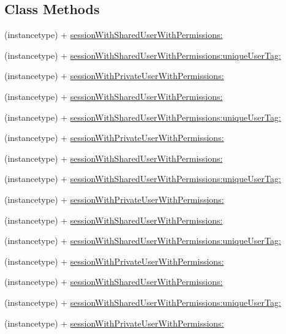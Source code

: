 \subsection*{Class Methods}
\begin{DoxyCompactItemize}
\item 
(instancetype) + \hyperlink{interfaceFBTestSession_a27f8f36ddb23ea218117bc2e927d8039}{session\+With\+Shared\+User\+With\+Permissions\+:}
\item 
(instancetype) + \hyperlink{interfaceFBTestSession_aeee103e1f8eecc2e67381736a0f36a5d}{session\+With\+Shared\+User\+With\+Permissions\+:unique\+User\+Tag\+:}
\item 
(instancetype) + \hyperlink{interfaceFBTestSession_a435c3fc5a918dc5d0a4cfb05cf95e454}{session\+With\+Private\+User\+With\+Permissions\+:}
\item 
(instancetype) + \hyperlink{interfaceFBTestSession_a27f8f36ddb23ea218117bc2e927d8039}{session\+With\+Shared\+User\+With\+Permissions\+:}
\item 
(instancetype) + \hyperlink{interfaceFBTestSession_aeee103e1f8eecc2e67381736a0f36a5d}{session\+With\+Shared\+User\+With\+Permissions\+:unique\+User\+Tag\+:}
\item 
(instancetype) + \hyperlink{interfaceFBTestSession_a435c3fc5a918dc5d0a4cfb05cf95e454}{session\+With\+Private\+User\+With\+Permissions\+:}
\item 
(instancetype) + \hyperlink{interfaceFBTestSession_a27f8f36ddb23ea218117bc2e927d8039}{session\+With\+Shared\+User\+With\+Permissions\+:}
\item 
(instancetype) + \hyperlink{interfaceFBTestSession_aeee103e1f8eecc2e67381736a0f36a5d}{session\+With\+Shared\+User\+With\+Permissions\+:unique\+User\+Tag\+:}
\item 
(instancetype) + \hyperlink{interfaceFBTestSession_a435c3fc5a918dc5d0a4cfb05cf95e454}{session\+With\+Private\+User\+With\+Permissions\+:}
\item 
(instancetype) + \hyperlink{interfaceFBTestSession_a27f8f36ddb23ea218117bc2e927d8039}{session\+With\+Shared\+User\+With\+Permissions\+:}
\item 
(instancetype) + \hyperlink{interfaceFBTestSession_aeee103e1f8eecc2e67381736a0f36a5d}{session\+With\+Shared\+User\+With\+Permissions\+:unique\+User\+Tag\+:}
\item 
(instancetype) + \hyperlink{interfaceFBTestSession_a435c3fc5a918dc5d0a4cfb05cf95e454}{session\+With\+Private\+User\+With\+Permissions\+:}
\item 
(instancetype) + \hyperlink{interfaceFBTestSession_a27f8f36ddb23ea218117bc2e927d8039}{session\+With\+Shared\+User\+With\+Permissions\+:}
\item 
(instancetype) + \hyperlink{interfaceFBTestSession_aeee103e1f8eecc2e67381736a0f36a5d}{session\+With\+Shared\+User\+With\+Permissions\+:unique\+User\+Tag\+:}
\item 
(instancetype) + \hyperlink{interfaceFBTestSession_a435c3fc5a918dc5d0a4cfb05cf95e454}{session\+With\+Private\+User\+With\+Permissions\+:}
\end{DoxyCompactItemize}
